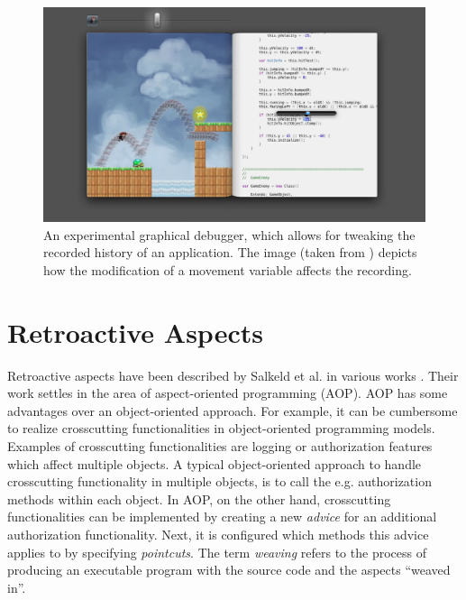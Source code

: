 \begin{figure}[h!]
	\centering
	\includegraphics[width=1.0\textwidth]
		{./resources/figures/victor.png}

	\caption{
	An experimental graphical debugger, which allows for tweaking the
	recorded history of an application. 
	The image (taken from \cite{Victor2012}) depicts how
	the modification of a movement variable affects the recording.
	}
	\label{fig:victor}
\end{figure}


\section{Retroactive Aspects}
Retroactive aspects have been described by Salkeld et al. in various works 
\cite{Salkeld2011, Salkeld2015}. Their work settles in the area of 
aspect-oriented programming (AOP). 
%
AOP has some advantages over an object-oriented approach. For example, it 
can be cumbersome to realize crosscutting functionalities in object-oriented 
programming models. Examples of crosscutting functionalities are logging or 
authorization features which affect multiple objects. 
A typical object-oriented approach to handle crosscutting functionality in 
multiple objects, is to call the e.g. authorization methods within each object. 
%
In AOP, on the other hand, crosscutting functionalities can be implemented by
creating a new \emph{advice} for an additional authorization functionality. 
Next, it is configured which methods this advice applies to by specifying 
\emph{pointcuts}. The term \emph{weaving} refers to the process of producing 
an executable program with the source code and the aspects ``weaved in''.

